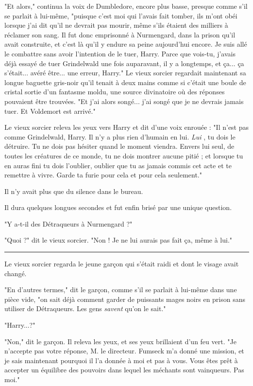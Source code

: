 "Et alors," continua la voix de Dumbledore, encore plus basse, presque comme s'il se parlait à lui-même, "puisque c'est moi qui l'avais fait tomber, ils m'ont obéi lorsque j'ai dit qu'il ne devrait pas mourir, même s'ils étaient des milliers à réclamer son sang. Il fut donc emprisonné à Nurmengard, dans la prison qu'il avait construite, et c'est là qu'il y endure sa peine aujourd'hui encore. Je suis allé le combattre sans avoir l'intention de le tuer, Harry. Parce que vois-tu, j'avais déjà essayé de tuer Grindelwald une fois auparavant, il y a longtemps, et ça... ça s'était... avéré être... une erreur, Harry." Le vieux sorcier regardait maintenant sa longue baguette gris-noir qu'il tenait à deux mains comme si c'était une boule de cristal sortie d'un fantasme moldu, une source divinatoire où des réponses pouvaient être trouvées. "Et j'ai alors songé... j'ai songé que je ne devrais jamais tuer. Et Voldemort est arrivé."

Le vieux sorcier releva les yeux vers Harry et dit d'une voix enrouée : "Il n'est pas comme Grindelwald, Harry. Il n'y a plus rien d'humain en lui. \emph{Lui} , tu dois le détruire. Tu ne dois pas hésiter quand le moment viendra. Envers lui seul, de toutes les créatures de ce monde, tu ne dois montrer aucune pitié ; et lorsque tu en auras fini tu dois l'oublier, oublier que tu as jamais commis cet acte et te remettre à vivre. Garde ta furie pour cela et pour cela seulement."

Il n'y avait plus que du silence dans le bureau.

Il dura quelques longues secondes et fut enfin brisé par une unique question.

"Y a-t-il des Détraqueurs à Nurmengard ?"

"Quoi ?" dit le vieux sorcier. "Non ! Je ne lui aurais pas fait ça, même à lui."
\par\noindent\rule{\textwidth}{0.4pt}
Le vieux sorcier regarda le jeune garçon qui s'était raidi et dont le visage avait changé.

"En d'autres termes," dit le garçon, comme s'il se parlait à lui-même dans une pièce vide, "on sait déjà comment garder de puissants mages noirs en prison sans utiliser de Détraqueurs. Les gens \emph{savent}  qu'on le sait."

"Harry...?"

"Non," dit le garçon. Il releva les yeux, et ses yeux brillaient d'un feu vert. "Je n'accepte pas votre réponse, M. le directeur. Fumseck m'a donné une mission, et je sais maintenant pourquoi il l'a donnée à moi et pas à vous. Vous êtes prêt à accepter un équilibre des pouvoirs dans lequel les méchants sont vainqueurs. Pas moi."

